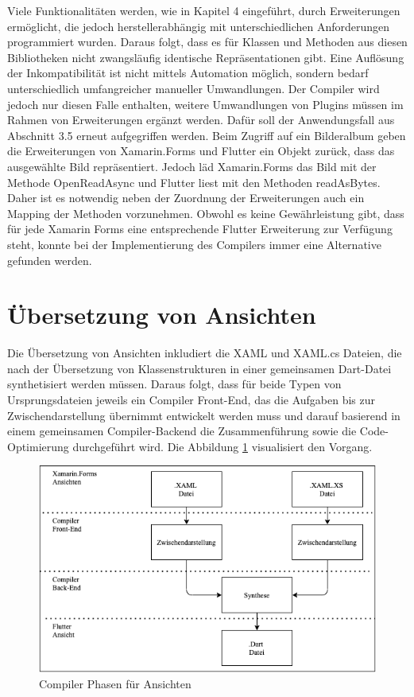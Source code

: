Viele Funktionalitäten werden, wie in Kapitel 4 eingeführt, durch Erweiterungen ermöglicht, die jedoch herstellerabhängig mit unterschiedlichen Anforderungen programmiert wurden.  Daraus folgt,  dass es für Klassen und Methoden aus diesen Bibliotheken nicht zwangsläufig identische Repräsentationen gibt.  Eine Auflösung der Inkompatibilität ist nicht mittels Automation möglich, sondern bedarf unterschiedlich umfangreicher manueller Umwandlungen.  Der Compiler wird jedoch nur diesen Falle enthalten, weitere Umwandlungen von Plugins müssen im Rahmen von Erweiterungen ergänzt werden.  Dafür soll der Anwendungsfall aus Abschnitt 3.5 erneut aufgegriffen werden.  Beim Zugriff auf ein Bilderalbum geben die Erweiterungen von Xamarin.Forms und Flutter ein Objekt zurück, dass das ausgewählte Bild repräsentiert.  Jedoch läd Xamarin.Forms das Bild mit der Methode \glq OpenReadAsync\grq{} und Flutter liest mit den Methoden \glq readAsBytes\grq .  Daher ist es notwendig neben der Zuordnung der Erweiterungen auch ein Mapping der Methoden vorzunehmen. Obwohl es keine Gewährleistung gibt, dass für jede Xamarin Forms eine entsprechende Flutter 
Erweiterung zur Verfügung steht, konnte bei der Implementierung des Compilers immer eine  Alternative gefunden werden.


\section{Übersetzung von Ansichten}
Die Übersetzung von Ansichten inkludiert die XAML und XAML.cs Dateien, die nach der Übersetzung von Klassenstrukturen in einer gemeinsamen Dart-Datei synthetisiert werden müssen.  Daraus folgt,  dass für beide Typen von Ursprungsdateien jeweils ein Compiler Front-End,  das die Aufgaben bis zur Zwischendarstellung übernimmt entwickelt werden muss und darauf basierend in einem gemeinsamen Compiler-Backend die Zusammenführung sowie die Code-Optimierung durchgeführt wird.  Die Abbildung  \ref{fig:ViewCompilerPhases} visualisiert den Vorgang. 

\begin{figure}[!ht]
 \includegraphics[width=\textwidth,keepaspectratio]{Images/Implementation/ViewCompiler.png}
 \caption{Compiler Phasen für Ansichten}
 \label{fig:ViewCompilerPhases}
\end{figure}

